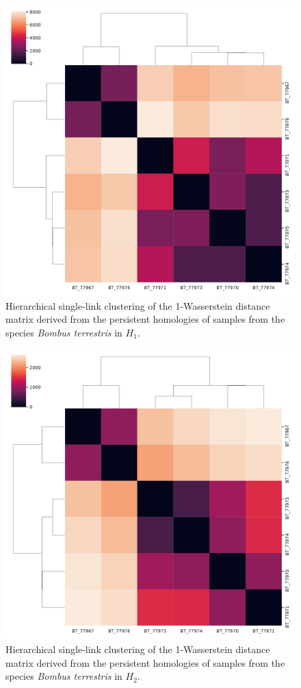 \begin{figure}[h]
  \centering
  \includegraphics[scale=0.35]{clusters/wasserstein_h1_bt.pdf}
  \caption{\label{wbt1} Hierarchical single-link clustering of the 1-Wasserstein distance matrix derived from the persistent homologies of samples from the species \textit{Bombus terrestris} in $H_{1}$. }
\end{figure}

\begin{figure}[]
  \centering
  \includegraphics[scale=0.35]{clusters/wasserstein_h2_bt.pdf}
  \caption{\label{wbt2} Hierarchical single-link clustering of the 1-Wasserstein distance matrix derived from the persistent homologies of samples from the species \textit{Bombus terrestris} in $H_{2}$. }
\end{figure}

